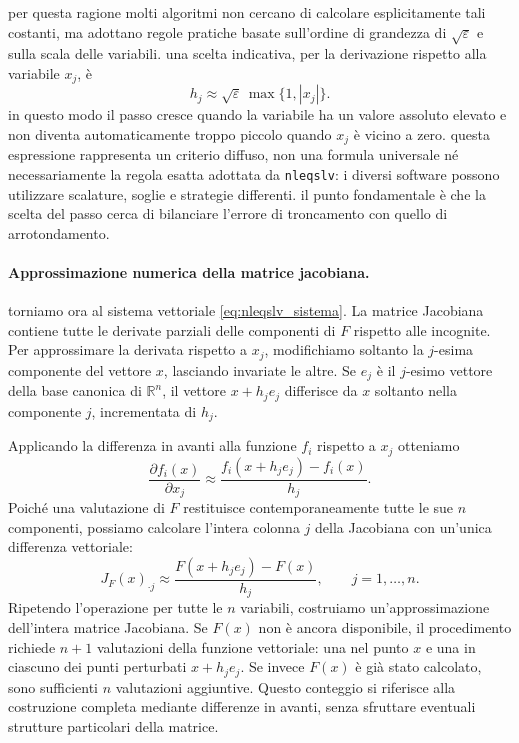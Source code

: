 per questa ragione molti algoritmi non cercano di calcolare esplicitamente tali costanti, ma adottano regole pratiche basate sull'ordine di grandezza di $\sqrt{\varepsilon}$ e sulla scala delle variabili. una scelta indicativa, per la derivazione rispetto alla variabile $x_j$, è
\begin{equation*}
 h_j\approx\sqrt{\varepsilon}\,\max\{1,|x_j|\}.
 \label{eq:passo_scalato}
\end{equation*}
in questo modo il passo cresce quando la variabile ha un valore assoluto elevato e non diventa automaticamente troppo piccolo quando $x_j$ è vicino a zero. questa espressione rappresenta un criterio diffuso, non una formula universale né necessariamente la regola esatta adottata da \texttt{nleqslv}: i diversi software possono utilizzare scalature, soglie e strategie differenti. il punto fondamentale è che la scelta del passo cerca di bilanciare l'errore di troncamento con quello di arrotondamento.

\paragraph{Approssimazione numerica della matrice jacobiana.}
torniamo ora al sistema vettoriale \eqref{eq:nleqslv_sistema}. La matrice Jacobiana contiene tutte le derivate parziali delle componenti di $F$ rispetto alle incognite. Per approssimare la derivata rispetto a $x_j$, modifichiamo soltanto la $j$-esima componente del vettore $x$, lasciando invariate le altre. Se $e_j$ è il $j$-esimo vettore della base canonica di $\mathbb{R}^n$, il vettore $x+h_je_j$ differisce da $x$ soltanto nella componente $j$, incrementata di $h_j$.

Applicando la differenza in avanti alla funzione $f_i$ rispetto a $x_j$ otteniamo
\begin{equation}
 \frac{\partial f_i(x)}{\partial x_j}
 \approx\frac{f_i(x+h_je_j)-f_i(x)}{h_j}.
 \label{eq:jacobiana_elemento}
\end{equation}
Poiché una valutazione di $F$ restituisce contemporaneamente tutte le sue $n$ componenti, possiamo calcolare l'intera colonna $j$ della Jacobiana con un'unica differenza vettoriale:
\begin{equation}
 J_F(x)_{\cdot j}\approx
 \frac{F(x+h_je_j)-F(x)}{h_j},
 \qquad j=1,\ldots,n.
 \label{eq:jacobiana_colonna}
\end{equation}
Ripetendo l'operazione per tutte le $n$ variabili, costruiamo un'approssimazione dell'intera matrice Jacobiana. Se $F(x)$ non è ancora disponibile, il procedimento richiede $n+1$ valutazioni della funzione vettoriale: una nel punto $x$ e una in ciascuno dei punti perturbati $x+h_je_j$. Se invece $F(x)$ è già stato calcolato, sono sufficienti $n$ valutazioni aggiuntive. Questo conteggio si riferisce alla costruzione completa mediante differenze in avanti, senza sfruttare eventuali strutture particolari della matrice.

